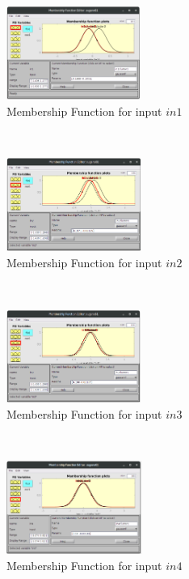 \documentclass[11pt]{article}
\begin{document}
\pagebreak

\begin{figure}[ht]
	\centering
	\begin{subfigure}[t]{0.3\textwidth}
		\centering
		\includegraphics[height=1.2in]{images/fcm_in1}
		\caption{Membership Function for input $in1$}
	\end{subfigure}
	~ 
	\begin{subfigure}[t]{0.3\textwidth}
		\centering
		\includegraphics[height=1.2in]{images/fcm_in2}
		\caption{Membership Function for input $in2$}
	\end{subfigure}
	~
	\begin{subfigure}[t]{0.3\textwidth}
		\centering
		\includegraphics[height=1.2in]{images/fcm_in3}
		\caption{Membership Function for input $in3$}
	\end{subfigure}
	\\
	\begin{subfigure}[t]{0.3\textwidth}
		\centering
		\includegraphics[height=1.2in]{images/fcm_in4}
		\caption{Membership Function for input $in4$}
	\end{subfigure}
	~ 
	\begin{subfigure}[t]{0.3\textwidth}
		\centering

\end{subfigure}
\end{figure}
\end{document}
